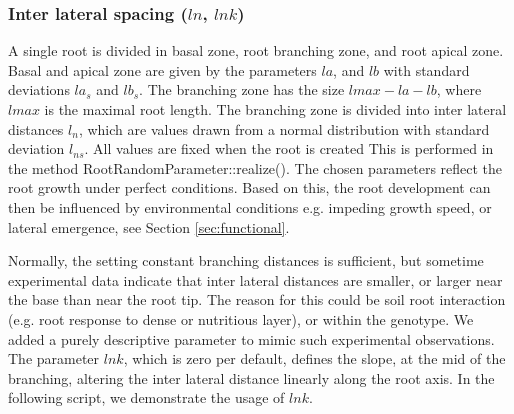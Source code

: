 \subsubsection*{Inter lateral spacing ($ln$, $lnk$)} \label{ssec:spacing}

A single root is divided in basal zone, root branching zone, and root apical zone. Basal and apical zone are given by the parameters $la$, and $lb$ with standard deviations $la_s$ and $lb_s$. The branching zone has the size $lmax-la-lb$, where $lmax$ is the maximal root length. The branching zone is divided into inter lateral distances $l_n$, which are values drawn from a normal distribution with standard deviation $l_{ns}$. All values are fixed when the root is created This is performed in the method RootRandomParameter::realize(). The chosen parameters reflect the root growth under perfect conditions. Based on this, the root development can then be influenced by environmental conditions e.g. impeding growth speed, or lateral emergence, see Section \ref{sec:functional}.

Normally, the setting constant branching distances is sufficient, but sometime experimental data indicate that inter lateral distances are smaller, or larger near the base than near the root tip. The reason for this could be soil root interaction (e.g. root response to dense or nutritious layer), or within the genotype. We added a purely descriptive parameter to mimic such experimental observations. The parameter $lnk$, which is zero per default, defines the slope, at the mid of the branching, altering the inter lateral distance linearly along the root axis. In the following script, we demonstrate the usage of $lnk$.



